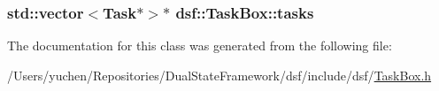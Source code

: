 \subsubsection[{tasks}]{\setlength{\rightskip}{0pt plus 5cm}std\+::vector$<${\bf Task}$\ast$$>$$\ast$ dsf\+::\+Task\+Box\+::tasks\hspace{0.3cm}{\ttfamily [protected]}}\label{classdsf_1_1_task_box_ae13d0d245cacbf7f4019f7ff5486aa79}


The documentation for this class was generated from the following file\+:\begin{DoxyCompactItemize}
\item 
/\+Users/yuchen/\+Repositories/\+Dual\+State\+Framework/dsf/include/dsf/\hyperlink{_task_box_8h}{Task\+Box.\+h}\end{DoxyCompactItemize}
